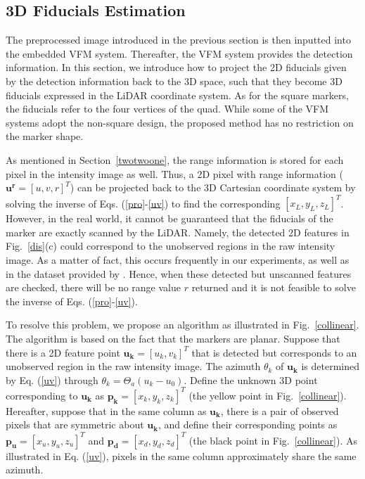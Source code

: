 \subsection{3D Fiducials Estimation} \label{twotwothree}
The preprocessed image introduced in the previous section is then inputted into the embedded VFM system. Thereafter, the VFM system provides the detection information. In this section, we introduce how to project the 2D fiducials given by the detection information back to the 3D space, such that they become 3D fiducials expressed in the LiDAR coordinate system. As for the square markers, the fiducials refer to the four vertices of the quad. While some of the VFM systems adopt the non-square design, the proposed method has no restriction on the marker shape.
\par
As mentioned in Section~\ref{twotwoone}, the range information is stored for each pixel in the intensity image as well. Thus, a 2D pixel with range information ($\mathbf{{u}^{r}}=[u,v,r]^{T}$) can be projected back to the 3D Cartesian coordinate system by solving the inverse of Eqs. (\ref{pro}-\ref{uv}) to find the corresponding $[x_{L},y_{L},z_{L}]^{T}$. However, in the real world, it cannot be guaranteed that the fiducials of the marker are exactly scanned by the LiDAR. Namely, the detected 2D features in Fig.~\ref{dis}(c) could correspond to the unobserved regions in the raw intensity image. As a matter of fact, this occurs frequently in our experiments, as well as in the dataset provided by \cite{lt}. Hence, when these detected but unscanned features are checked, there will be no range value $r$ returned and it is not feasible to solve the inverse of Eqs. (\ref{pro}-\ref{uv}).
\par
To resolve this problem, we propose an algorithm as illustrated in Fig.~\ref{collinear}. The algorithm is based on the fact that the markers are planar. Suppose that there is a 2D feature point $\mathbf{{u}_{k}}=[u_{k},v_{k}]^{T}$ that is detected but corresponds to an unobserved region in the raw intensity image. The azimuth $\theta_{k}$ of $\mathbf{{u}_{k}}$ is determined by Eq. (\ref{uv}) through $\theta_{k}=\Theta_{a}(u_{k}-u_{0})$. Define the unknown 3D point corresponding to $\mathbf{{u}_{k}}$ as $\mathbf{{p}_{k}}=[x_{k},y_{k},z_{k}]^{T}$ (the yellow point in Fig.~\ref{collinear}).  Hereafter, suppose that in the same column as $\mathbf{{u}_{k}}$, there is a pair of observed pixels that are symmetric about $\mathbf{{u}_{k}}$, and define their corresponding points as $\mathbf{{p}_{u}}=[x_{u},y_{u},z_{u}]^{T}$ and $\mathbf{{p}_{d}}=[x_{d},y_{d},z_{d}]^{T}$ (the black point in Fig.~\ref{collinear}). As illustrated in Eq. (\ref{uv}), pixels in the same column approximately share the same azimuth. 
